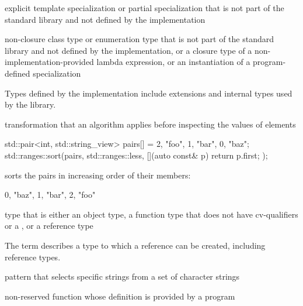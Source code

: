 %
explicit template specialization or partial specialization
that is not part of the \Cpp{} standard library and
not defined by the implementation

%
non-closure class type or enumeration type
that is not part of the \Cpp{} standard library and
not defined by the implementation,
or a closure type of a non-implementation-provided lambda expression,
or an instantiation of a program-defined specialization

\begin{defnote}
Types defined by the implementation include
extensions and internal types used by the library.
\end{defnote}

%
transformation that an algorithm applies
before inspecting the values of elements

\begin{example}
\begin{codeblock}
std::pair<int, std::string_view> pairs[] = {{2, "foo"}, {1, "bar"}, {0, "baz"}};
std::ranges::sort(pairs, std::ranges::less{}, [](auto const& p) { return p.first; });
\end{codeblock}
sorts the pairs in increasing order of their  members:
\begin{codeblock}
{{0, "baz"}, {1, "bar"}, {2, "foo"}}
\end{codeblock}
\end{example}

%
type that is either an
object type, a function type that does not have cv-qualifiers or a
, or a reference type

\begin{defnote}
The term describes a type to which a reference can be created,
including reference types.
\end{defnote}

pattern that selects specific strings
from a set of character strings

%
non-reserved function
whose definition is provided by a \Cpp{} program

